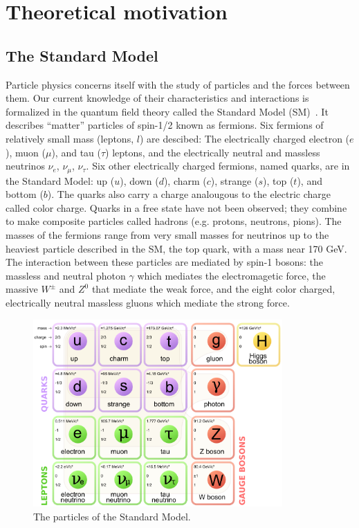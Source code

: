 \clearpage
\section{Theoretical motivation\label{sec:theory}}


\subsection{The Standard Model\label{sec:SM}}

Particle physics concerns itself with the study of particles and the 
forces between them. Our current knowledge of their characteristics and 
interactions is formalized in the quantum field theory called the Standard Model 
(SM)~\cite{bettini2014introduction,griffiths2008introduction}.
It describes ``matter'' particles of spin-1/2 known as 
fermions. Six fermions of relatively small mass (leptons, $l$) are descibed:
The electrically charged electron ($e$), muon ($\mu$), and tau ($\tau$) 
leptons, and the electrically neutral and massless neutrinos 
$\nu_{e}$, $\nu_{\mu}$, $\nu_{\tau}$.  
Six other electrically charged 
fermions, named quarks, are in the Standard Model: up ($u$), down ($d$), 
charm ($c$), strange ($s$), top ($t$), and bottom ($b$). The quarks also carry
a charge analougous to the electric charge called color charge. Quarks in a 
free state have not been observed; they combine to make composite
particles called hadrons (e.g. protons, neutrons, pions). The masses of the 
fermions range from very small masses for neutrinos up to the heaviest 
particle described in the SM, the top quark, with a mass near 170 GeV. \\
\indent The interaction between these particles are mediated by spin-1 bosons: 
the massless and neutral photon $\gamma$ which mediates the electromagetic force, 
the massive $W^\pm$ and $Z^0$ that mediate the weak force, and the eight color 
charged, electrically neutral massless gluons which mediate the strong force.

\begin{figure}[h!t]
  \begin{center}
       \includegraphics[width=0.85\textwidth,]{figures/Standard_Model_of_Elementary_Particles.png}
       \caption{The particles of the Standard Model.}
    \label{fig:SM-particles}
  \end{center}
\end{figure}

